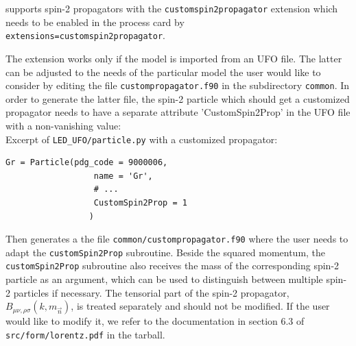 \gosam{} supports spin-2 propagators with the \texttt{customspin2propagator} extension which
needs to be enabled in the process card by \\
\texttt{extensions=customspin2propagator}.

The extension works only if the model is imported from an UFO file. 
The latter can  be adjusted to the needs of the particular model the 
user would like to consider by editing the file \texttt{custompropagator.f90}
in the subdirectory \texttt{common}. 
In order to generate the latter file,
the spin-2 particle which should get a customized propagator needs to have a
separate attribute 'CustomSpin2Prop' in the UFO file with a non-vanishing
value:\\
Excerpt of \texttt{LED\_UFO/particle.py} with a customized propagator:
\begin{lstlisting}[style=py]
    Gr = Particle(pdg_code = 9000006,
                  name = 'Gr',
                  # ...
                  CustomSpin2Prop = 1
                 )
\end{lstlisting}
Then \gosam{} generates a the file \texttt{common/custompropagator.f90} where the user needs
to adapt the \texttt{customSpin2Prop} subroutine.
Beside the squared momentum, the \texttt{customSpin2Prop} subroutine also receives the
mass of the corresponding spin-2 particle as an argument, which
can be used to distinguish between multiple spin-2 particles if necessary.
The tensorial part of the spin-2 propagator, $B_{\mu\nu,\rho\sigma}(k,m_{\vec n})$, is treated separately 
and should not be modified.  If the user would like to modify it, we refer to the  documentation in 
section 6.3 of \texttt{src/form/lorentz.pdf} in the \gosam{} tarball.
